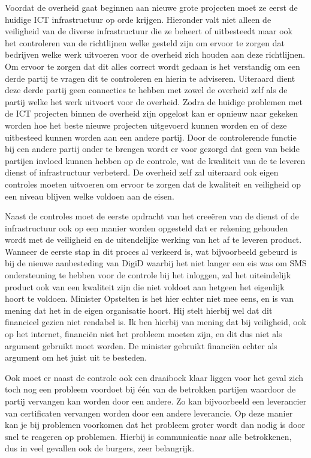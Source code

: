 Voordat de overheid gaat beginnen aan nieuwe grote projecten moet ze eerst de huidige ICT infrastructuur op orde krijgen. Hieronder valt niet alleen de veiligheid van de diverse infrastructuur die ze beheert of uitbesteedt maar ook het controleren van de richtlijnen welke gesteld zijn om ervoor te zorgen dat bedrijven welke werk uitvoeren voor de overheid zich houden aan deze richtlijnen. Om ervoor te zorgen dat dit alles correct wordt gedaan is het verstandig om een derde partij te vragen dit te controleren en hierin te adviseren. Uiteraard dient deze derde partij geen connecties te hebben met zowel de overheid zelf als de partij welke het werk uitvoert voor de overheid. Zodra de huidige problemen met de ICT projecten binnen de overheid zijn opgelost kan er opnieuw naar gekeken worden hoe het beste nieuwe projecten uitgevoerd kunnen worden en of deze uitbesteed kunnen worden aan een andere partij. Door de controlerende functie bij een andere partij onder te brengen wordt er voor gezorgd dat geen van beide partijen invloed kunnen hebben op de controle, wat de kwaliteit van de te leveren dienst of infrastructuur verbeterd. De overheid zelf zal uiteraard ook eigen controles moeten uitvoeren om ervoor te zorgen dat de kwaliteit en veiligheid op een niveau blijven welke voldoen aan de eisen. 

Naast de controles moet de eerste opdracht van het cree\"{e}ren van de dienst of de infrastructuur ook op een manier worden opgesteld dat er rekening gehouden wordt met de veiligheid en de uitendelijke werking van het af te leveren product. Wanneer de eerste stap in dit proces al verkeerd is, wat bijvoorbeeld gebeurd is bij de nieuwe aanbesteding van DigiD waarbij het niet langer een eis was om SMS ondersteuning te hebben voor de controle bij het inloggen, zal het uiteindelijk product ook van een kwaliteit zijn die niet voldoet aan hetgeen het eigenlijk hoort te voldoen. Minister Opstelten is het hier echter niet\cite{bib.tweakers.opstelten} mee eens, en is van mening dat het in de eigen organisatie hoort. Hij stelt hierbij wel dat dit financieel gezien niet rendabel is. Ik ben hierbij van mening dat bij veiligheid, ook op het internet, financi\"{e}n niet het probleem moeten zijn, en dit dus niet als argument gebruikt moet worden. De minister gebruikt financi\"{e}n echter als argument om het juist uit te besteden.

Ook moet er naast de controle ook een draaiboek klaar liggen voor het geval zich toch nog een probleem voordoet bij  \'{e}\'{e}n van de betrokken partijen waardoor de partij vervangen kan worden door een andere. Zo kan bijvoorbeeld een leverancier van certificaten vervangen worden door een andere leverancie. Op deze manier kan je bij problemen voorkomen dat het probleem groter wordt dan nodig is door snel te reageren op problemen. Hierbij is communicatie naar alle betrokkenen, dus in veel gevallen ook de burgers, zeer belangrijk.

